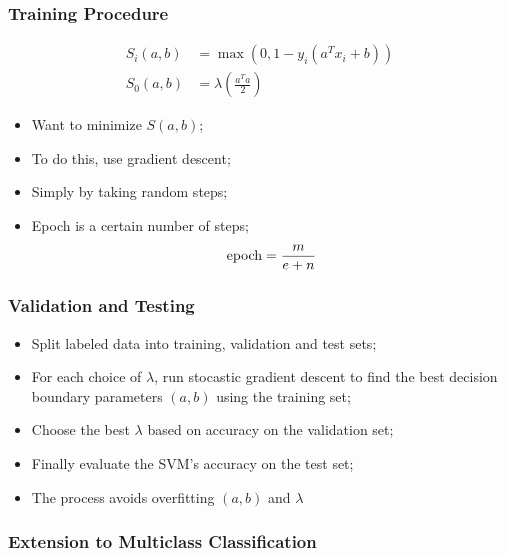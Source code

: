     \subsubsection{Training Procedure}
    
      \begin{align}
        S_{i}\left( a, b \right) &= \max\left( 0, 1 - y_{i} \left( a^{T} x_{i} + b \right) \right) \\
        S_{0}\left( a, b \right) &= \lambda \left( \frac{ a^{T} a }{ 2 } \right)
      \end{align}
      
      \begin{itemize}
        \item Want to minimize $ S\left( a, b \right) $;
        \item To do this, use gradient descent;
        \item Simply by taking random steps;
        \item Epoch is a certain number of steps;
        \begin{equation}
          \text{\rmfamily epoch} = \frac{m}{e + n}
        \end{equation}
      \end{itemize}
      
    \subsubsection{Validation and Testing}
    
      \begin{itemize}
        \item Split labeled data into training, validation and test sets;
        \item For each choice of $ \lambda $, run stocastic gradient descent to find the best decision boundary parameters $ \left( a, b \right) $ using the training set;
        \item Choose the best $ \lambda $ based on accuracy on the validation set;
        \item Finally evaluate the SVM's accuracy on the test set;
        \item The process avoids overfitting $ \left( a, b \right) $ and $ \lambda $
      \end{itemize}
      
    \subsubsection{Extension to Multiclass Classification}
    
